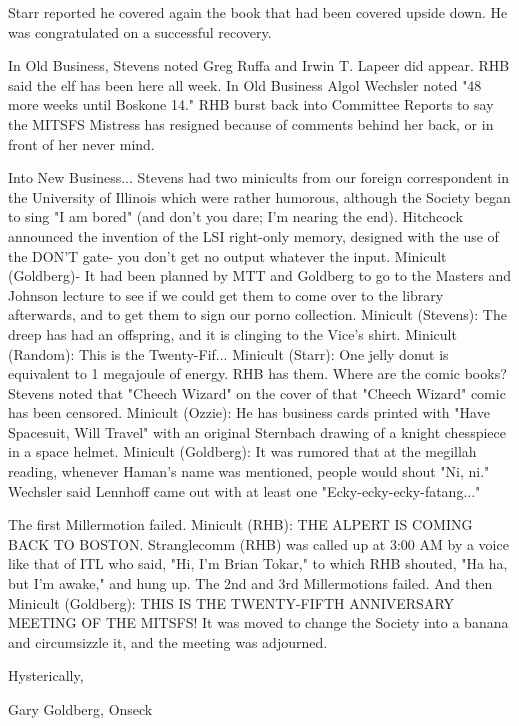 \documentclass[12pt]{article}
\begin{document}
Starr reported he covered again the book that had been covered upside down. He was congratulated on a successful recovery.

In Old Business, Stevens noted Greg Ruffa and Irwin T. Lapeer did appear. RHB said the elf has been here all week. In Old Business Algol Wechsler noted "48 more weeks until Boskone 14." RHB burst back into Committee Reports to say the MITSFS Mistress has resigned because of comments behind her back, or in front of her never mind.

Into New Business... Stevens had two minicults from our foreign correspondent in the University of Illinois which were rather humorous, although the Society began to sing "I am bored" (and don't you dare; I'm nearing the end). Hitchcock announced the invention of the LSI right-only memory, designed with the use of the DON'T gate- you don't get no output whatever the input. Minicult (Goldberg)- It had been planned by MTT and Goldberg to go to the Masters and Johnson lecture to see if we could get them to come over to the library afterwards, and to get them to sign our porno collection. Minicult (Stevens): The dreep has had an offspring, and it is clinging to the Vice's shirt. Minicult (Random): This is the Twenty-Fif... Minicult (Starr): One jelly donut is equivalent to 1 megajoule of energy. RHB has them. Where are the comic books? Stevens noted that "Cheech Wizard" on the cover of that "Cheech Wizard" comic has been censored. Minicult (Ozzie): He has business cards printed with "Have Spacesuit, Will Travel" with an original Sternbach drawing of a knight chesspiece in a space helmet. Minicult (Goldberg): It was rumored that at the megillah reading, whenever Haman's name was mentioned, people would shout "Ni, ni." Wechsler said Lennhoff came out with at least one "Ecky-ecky-ecky-fatang..."

The first Millermotion failed. Minicult (RHB): THE ALPERT IS COMING BACK TO BOSTON. Stranglecomm (RHB) was called up at 3:00 AM by a voice like that of ITL who said, "Hi, I'm Brian Tokar," to which RHB shouted, "Ha ha, but I'm awake," and hung up. The 2nd and 3rd Millermotions failed. And then Minicult (Goldberg): THIS IS THE TWENTY-FIFTH ANNIVERSARY MEETING OF THE MITSFS! It was moved to change the Society into a banana and circumsizzle it, and the meeting was adjourned.

\vspace{12pt}

\centerline{Hysterically,}
\centerline{Gary Goldberg, Onseck}
\end{document}

